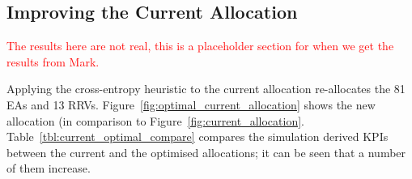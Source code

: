 \documentclass[preprint,12pt]{elsarticle}
\begin{document}



\subsection{Improving the Current Allocation}\label{sec:improve_current}
\textcolor{red}{The results here are not real, this is a placeholder section for when we get the results from Mark.}

Applying the cross-entropy heuristic to the current allocation re-allocates the 81 EAs and 13 RRVs. Figure~\ref{fig:optimal_current_allocation} shows the new allocation (in comparison to Figure~\ref{fig:current_allocation}. Table~\ref{tbl:current_optimal_compare} compares the simulation derived KPIs between the current and the optimised allocations; it can be seen that a number of them increase.
\end{document}
